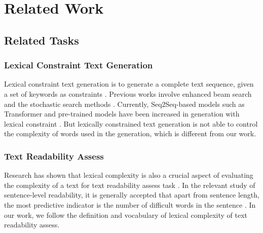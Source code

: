 \documentclass[11pt]{article}
\begin{document}
\section{Related Work}
\subsection{Related Tasks}
\subsubsection{Lexical Constraint Text Generation}
Lexical constraint text generation is to generate a complete text sequence, given a set of keywords as constraints \cite{zhang2020pointer}. Previous works involve enhanced beam search \cite{DBA, hu2019improved} and the stochastic search methods \cite{zhang2020pointer, sha2020gradient}. Currently, Seq2Seq-based models such as Transformer and pre-trained models have been increased in generation with lexical constraint \cite{wang2021mention,liu2020kg, wang2021retrieval, fan2020enhanced, liu2021constrained}. But lexically constrained text generation is not able to control the complexity of words used in the generation, which is different from our work.
\subsubsection{Text Readability Assess}
Research has shown that lexical complexity is also a crucial aspect of evaluating the complexity of a text for text readability assess task \cite{chakraborty2021simple}. In the relevant study of sentence-level readability, it is generally accepted that apart from sentence length, the most predictive indicator is the number of difficult words in the sentence \cite{weiss2022assessing}. In our work, we follow the definition and vocabulary of lexical complexity of text readability assess.
\end{document}
